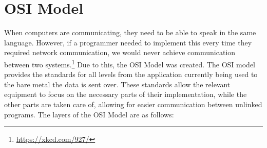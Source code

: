 	\section{OSI Model}
		When computers are communicating, they need to be able to speak in the same language.\cite{HackingAOE}
		However, if a programmer needed to implement this every time they required network communication, we would never achieve communication between two systems.\footnote{\url{https://xkcd.com/927/}}
		Due to this, the OSI Model was created.
		The OSI model provides the standards for all levels from the application currently being used to the bare metal the data is sent over.
		These standards allow the relevant equipment to focus on the necessary parts of their implementation, while the other parts are taken care of, allowing for easier communication between unlinked programs.
		The layers of the OSI Model are as follows:
